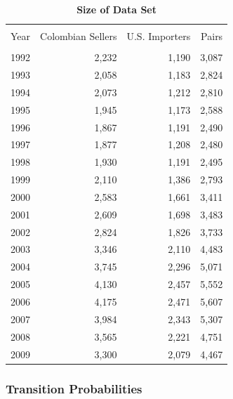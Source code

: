 \begin{table}[bph]
    \centering
    \begin{tabular}{lrrr} \hline \hline \\
        Year & Colombian Sellers & U.S. Importers & Pairs \\ \hline \\
        1992 & 2,232             & 1,190          & 3,087  \\
        1993 & 2,058             & 1,183          & 2,824  \\
        1994 & 2,073             & 1,212          & 2,810  \\
        1995 & 1,945             & 1,173          & 2,588  \\
        1996 & 1,867             & 1,191          & 2,490  \\
        1997 & 1,877             & 1,208          & 2,480  \\
        1998 & 1,930             & 1,191          & 2,495  \\
        1999 & 2,110             & 1,386          & 2,793  \\
        2000 & 2,583             & 1,661          & 3,411  \\
        2001 & 2,609             & 1,698          & 3,483  \\
        2002 & 2,824             & 1,826          & 3,733  \\
        2003 & 3,346             & 2,110          & 4,483  \\
        2004 & 3,745             & 2,296          & 5,071  \\
        2005 & 4,130             & 2,457          & 5,552  \\
        2006 & 4,175             & 2,471          & 5,607  \\
        2007 & 3,984             & 2,343          & 5,307  \\
        2008 & 3,565             & 2,221          & 4,751  \\
        2009 & 3,300             & 2,079          & 4,467  \\ \hline
    \end{tabular}
    \caption{\textbf{Size of Data Set}}
    \label{tab:data_size}\centering{\small \ }
\end{table}

\subsubsection{Transition Probabilities}

